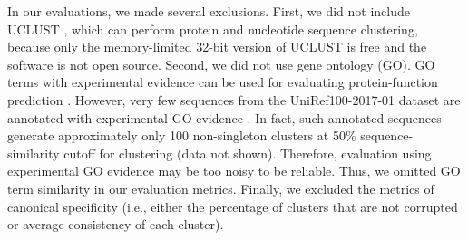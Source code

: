 \documentclass[11pt,letterpaper]{article}
\begin{document}
In our evaluations, we made several exclusions.
First, we did not include UCLUST \citep{edgar2010search}, which can perform protein and nucleotide sequence clustering, because only the memory-limited 32-bit version of UCLUST is free and the software is not open source.
Second, we did not use gene ontology (GO).
GO terms with experimental evidence can be used for evaluating protein-function prediction \citep{radivojac2013large}.
However, very few sequences from the UniRef100-2017-01 dataset are annotated with experimental GO evidence \citep{suzek2014uniref}.
In fact, such annotated sequences generate approximately only 100 non-singleton clusters at 50\% sequence-similarity cutoff for clustering (data not shown).
Therefore, evaluation using experimental GO evidence may be too noisy to be reliable.
Thus, we omitted GO term similarity in our evaluation metrics.
Finally, we excluded the metrics of canonical specificity (i.e., either the percentage of clusters that are not corrupted or average consistency of each cluster).
\end{document}
